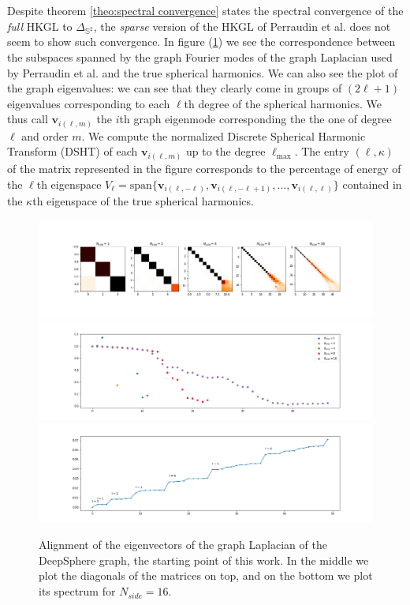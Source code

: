  Despite theorem \ref{theo:spectral convergence} \cite{Belkin:2005:TTF:2138147.2138189} states the spectral convergence of the \textit{full} HKGL to $\Delta_{\mathbb S^2}$, the \textit{sparse} version of the HKGL of Perraudin et al. does not seem to show such convergence. In figure (\ref{fig:Old spectrum1}) we see the correspondence between the subspaces spanned by the graph Fourier modes of the graph Laplacian used by Perraudin et al. and the true spherical harmonics. We can also see the plot of the graph eigenvalues: we can see that they clearly come in groups of $(2\ell+1)$ eigenvalues corresponding to each $\ell$th degree of the spherical harmonics. We thus call $\mathbf v_{i(\ell, m)}$ the $i$th graph eigenmode corresponding the the one of degree $\ell$ and order $m$. We compute the normalized Discrete Spherical Harmonic Transform (DSHT) of each $\mathbf v_{i(\ell, m)}$ up to the degree $\ell_\text{max}$. The entry $(\ell, \kappa)$ of the matrix represented in the figure corresponds to the percentage of energy of the $\ell$th eigenspace $V_\ell = \text{span}\{\mathbf v_{i(\ell, -\ell)}, \mathbf v_{i(\ell, -\ell+1)},...,\mathbf v_{i(\ell, \ell)}\}$ contained in the $\kappa$th eigenspace of the true spherical harmonics. 
\begin{figure}[h]
	\begin{center}
		\includegraphics[width=1\linewidth]{../codes/02.HeatKernelGraphLaplacian/HEALPix/06_figures/deepsphere_original.png}
		\includegraphics[width=1\linewidth]{../codes/02.HeatKernelGraphLaplacian/HEALPix/06_figures/deepsphere_original_diagonal.png}
		\includegraphics[width=1\linewidth]{../codes/02.HeatKernelGraphLaplacian/HEALPix/05_figs/old_results3.png}
	\end{center}
	\caption{\label{fig:Old spectrum1}Alignment of the eigenvectors of the graph Laplacian of the DeepSphere graph, the starting point of this work. In the middle we plot the diagonals of the matrices on top, and on the bottom we plot its spectrum for $N_{side}=16$.}
\end{figure} 

